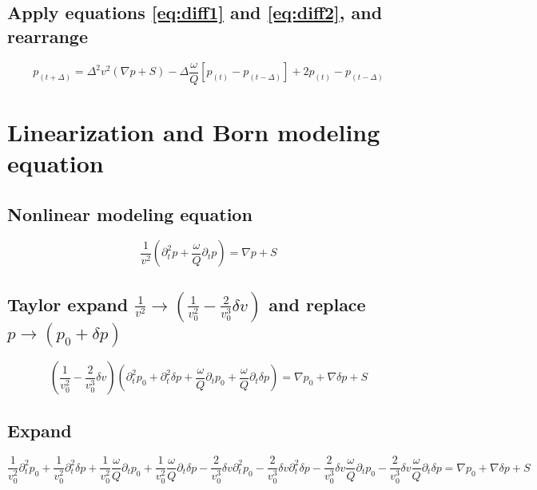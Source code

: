 \documentclass[10pt,fleqn]{article}
\begin{document}
\subsection{Apply equations \ref{eq:diff1} and \ref{eq:diff2}, and rearrange}
\begin{equation}
p_{(t+\Delta)} = \Delta^2 v^2 \left( \nabla p + S \right) - \Delta \frac{\omega}{Q} \left[ p_{(t)} - p_{(t - \Delta)} \right] 
+ 2 p_{(t)} - p_{(t - \Delta)} 
\end{equation}

\newpage
\section{Linearization and Born modeling equation}

\subsection{Nonlinear modeling equation}
\begin{equation}
\frac{1}{v^2} \left( \partial_t^2 p + \frac{\omega}{Q} \partial_t p \right) = \nabla p + S
\end{equation}

\subsection{Taylor expand $\displaystyle \frac{1}{v^2} \rightarrow \left( \frac{1}{v_0^2} - \frac{2}{v_0^3} \delta v \right) $
and replace $\displaystyle p \rightarrow \displaystyle (p_0 + \delta p)$}
\begin{equation}
\left( \frac{1}{v_0^2} - \frac{2}{v_0^3} \delta v \right) \left( \partial_t^2 p_0 + \partial_t^2 \delta p +
\frac{\omega}{Q} \partial_t p_0 + \frac{\omega}{Q} \partial_t \delta p \right) =
\nabla p_0 + \nabla \delta p + S
\end{equation}

\subsection{Expand}
\begin{equation}
  \frac{1}{v_0^2} \partial_t^2 p_0 
+ \frac{1}{v_0^2} \partial_t^2 \delta p
+ \frac{1}{v_0^2} \frac{\omega}{Q} \partial_t p_0 
+ \frac{1}{v_0^2} \frac{\omega}{Q} \partial_t \delta p
- \frac{2}{v_0^3} \delta v \partial_t^2 p_0
- \frac{2}{v_0^3} \delta v \partial_t^2 \delta p
- \frac{2}{v_0^3} \delta v \frac{\omega}{Q} \partial_t p_0
- \frac{2}{v_0^3} \delta v \frac{\omega}{Q} \partial_t \delta p
= \nabla p_0 + \nabla \delta p + S 
\end{equation}
\end{document}
